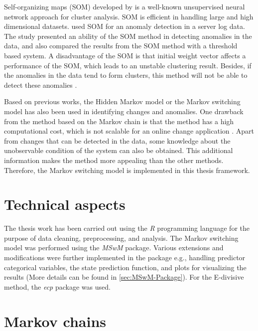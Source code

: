 Self-organizing maps (SOM) developed by \citet{kohonen1982self} is
a well-known unsupervised neural network approach for cluster analysis.
SOM is efficient in handling large and high dimensional datasets.
\citet{nousiainen2009anomaly} used SOM for an anomaly detection in
a server log data. The study presented an ability of the SOM method
in detecting anomalies in the data, and also compared the results
from the SOM method with a threshold based system. A disadvantage
of the SOM is that initial weight vector affects a performance of
the SOM, which leads to an unstable clustering result. Besides, if
the anomalies in the data tend to form clusters, this method will
not be able to detect these anomalies \citep{chandola2009anomaly}. 

Based on previous works, the Hidden Markov model or the Markov switching
model has also been used in identifying changes and anomalies. One
drawback from the method based on the Markov chain is that the method
has a high computational cost, which is not scalable for an online
change application \citep{patcha2007overview}. Apart from changes
that can be detected in the data, some knowledge about the unobservable
condition of the system can also be obtained. This additional information
makes the method more appealing than the other methods. Therefore,
the Markov switching model is implemented in this thesis framework. 

\section{Technical aspects}

The thesis work has been carried out using the \emph{R} programming
language \citep{rprogram} for the purpose of data cleaning, preprocessing,
and analysis. The Markov switching model was performed using the \emph{MSwM}
package. Various extensions and modifications were further implemented
in the package e.g., handling predictor categorical variables, the
state prediction function, and plots for visualizing the results (More
details can be found in \ref{sec:MSwM-Package}). For the E-divisive
method, the \emph{ecp} package was used. 

\section{Markov chains\label{sec:Markov-chains}}

